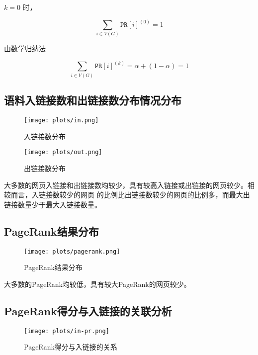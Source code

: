 \documentclass[a4paper]{article}
\begin{document}
$k = 0$ 时，

\begin{equation*}
    \sum_{i\in V(G)} \texttt{PR}[i]^{(0)} = 1
\end{equation*}

由数学归纳法

\begin{equation*}
    \sum_{i\in V(G)} \texttt{PR}[i]^{(k)} = \alpha + (1-\alpha) = 1
\end{equation*}

\subsection{语料入链接数和出链接数分布情况分布}

\begin{figure}[H]
    \centering
    \texttt{[image: plots/in.png]}
    \caption{入链接数分布}
\end{figure}


\begin{figure}[H]
    \centering
    \texttt{[image: plots/out.png]}
    \caption{出链接数分布}
\end{figure}    

大多数的网页入链接和出链接数均较少，具有较高入链接或出链接的网页较少。相较而言，入链接数较少的网页
的比例比出链接数较少的网页的比例多，而最大出链接数量少于最大入链接数量。

\subsection{PageRank结果分布}

\begin{figure}[H]
    \centering
    \texttt{[image: plots/pagerank.png]}
    \caption{PageRank结果分布}
\end{figure}    

大多数的PageRank均较低，具有较大PageRank的网页较少。

\subsection{PageRank得分与入链接的关联分析}

\begin{figure}[H]
    \centering
    \texttt{[image: plots/in-pr.png]}
    \caption{PageRank得分与入链接的关系}
\end{figure}    
\end{document}
